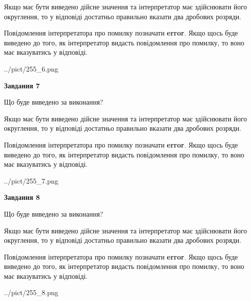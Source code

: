 \documentclass[12pt, ukrainian]{article}
\begin{document}
{\begin {Large}
Якщо має бути виведено дійсне значення та інтерпретатор має здійснювати його округлення, 
то у відповіді достатньо правильно вказати два дробових розряди.

Повідомлення інтерпретатора про помилку позначати \textbf{error}.
Якщо щось буде виведено до того, як інтерпретатор видасть повідомлення про помилку, 
то воно має вказуватись у відповіді. \par

\begin{center}
	{../pict/255_6.png}
\end{center}
\newpage

{\begin {center}\textbf{Завдання 7}\end {center}}\par
Що буде виведено за виконання? \par

Якщо має бути виведено дійсне значення та інтерпретатор має здійснювати його округлення, 
то у відповіді достатньо правильно вказати два дробових розряди.

Повідомлення інтерпретатора про помилку позначати \textbf{error}.
Якщо щось буде виведено до того, як інтерпретатор видасть повідомлення про помилку, 
то воно має вказуватись у відповіді. \par

\begin{center}
	{../pict/255_7.png}
\end{center}
\newpage

{\begin {center}\textbf{Завдання 8}\end {center}}\par
Що буде виведено за виконання? \par

Якщо має бути виведено дійсне значення та інтерпретатор має здійснювати його округлення, 
то у відповіді достатньо правильно вказати два дробових розряди.

Повідомлення інтерпретатора про помилку позначати \textbf{error}.
Якщо щось буде виведено до того, як інтерпретатор видасть повідомлення про помилку, 
то воно має вказуватись у відповіді. \par

\begin{center}
	{../pict/255_8.png}
\end{center}
\newpage


\end{Large}}
\end{document}
